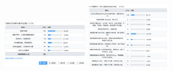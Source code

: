 \documentclass[12pt]{article}
\begin{document}
\begin{appendix}
\begin{figure}[htbp]
{        }%
        {
        \begin{minipage}[t]{0.3\linewidth}
        \centering
        \includegraphics[width=1.7in]{figure/pic4.png}
        \end{minipage}
        }%
        {
        \begin{minipage}[t]{0.3\linewidth}
        \centering
        \includegraphics[width=1.7in]{figure/pic5.png}
        \end{minipage}
        }
        
        \end{figure}



\end{appendix}
\end{document}
